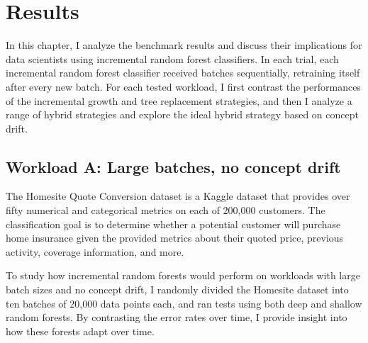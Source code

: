 \chapter{Results} In this chapter, I analyze the benchmark results and discuss
their implications for data scientists using incremental random forest
classifiers. In each trial, each incremental random forest classifier received
batches sequentially, retraining itself after every new batch. For each tested
workload, I first contrast the performances of the incremental growth and tree
replacement strategies, and then I analyze a range of hybrid strategies and
explore the ideal hybrid strategy based on concept drift.



\section{Workload A: Large batches, no concept drift}

The Homesite Quote Conversion dataset is a Kaggle dataset that provides over
fifty numerical and categorical metrics on each of 200,000 customers. The
classification goal is to determine whether a potential customer will purchase
home insurance given the provided metrics about their quoted price, previous
activity, coverage information, and more. \cite{Homesite}

To study how incremental random forests would perform on workloads with large
batch sizes and no concept drift, I randomly divided the Homesite dataset into
ten batches of 20,000 data points each, and ran tests using both deep and
shallow random forests. By contrasting the error rates over time, I provide insight
into how these forests adapt over time.

